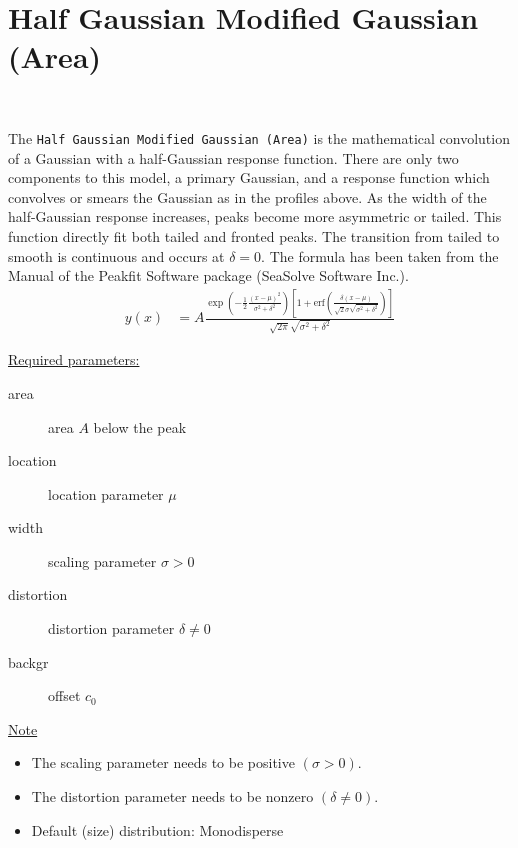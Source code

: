 \clearpage
\section{Half Gaussian Modified Gaussian (Area)} ~\\
\label{sec:HalfGaussianModifiedGaussianArea}

The \texttt{Half Gaussian Modified Gaussian (Area)} is the mathematical
convolution of a Gaussian with a half-Gaussian response function. There are only two
components to this model, a primary Gaussian, and a response function
which convolves or smears the Gaussian as in the profiles above. As the
width of the half-Gaussian response increases, peaks become more
asymmetric or tailed. This function directly fit both tailed and fronted peaks. The transition from
tailed to smooth is continuous and occurs at $\delta=0$. The formula has been taken from the
Manual of the Peakfit Software package (SeaSolve Software Inc.).
\begin{align}
y(x) &= A \frac{
            \exp\left(-\frac{1}{2} \frac{\left(x-\mu\right)^2}{\sigma^2+\delta^2}\right)
            \left[1+\mathrm{erf}\left(\frac{\delta \left(x-\mu\right)}{\sqrt{2}\sigma\sqrt{\sigma^2+\delta^2}}\right)\right]
        }{
            \sqrt{2\pi}\sqrt{\sigma^2+\delta^2}}
\end{align}

\underline{Required parameters:}
\begin{description}
    \item[area] area $A$ below the peak
    \item[location] location parameter $\mu$
    \item[width] scaling parameter $\sigma > 0$
    \item[distortion] distortion parameter $\delta \neq 0$
    \item[backgr] offset $c_0$
\end{description}

\underline{Note}
\begin{itemize}
  \item The scaling parameter needs to be positive $(\sigma > 0)$.
  \item The distortion parameter needs to be nonzero $(\delta \neq 0)$.
  \item Default (size) distribution: Monodisperse
\end{itemize}

